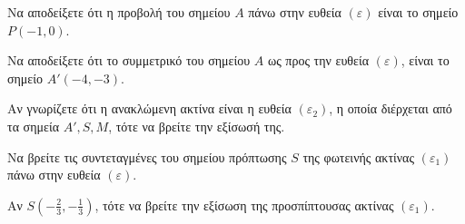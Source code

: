 \begin{alist}
    \item[$\alpha)$]
    \begin{rlist}
        \item Να αποδείξετε ότι η προβολή του σημείου $A$ πάνω στην ευθεία $(\varepsilon)$ είναι το σημείο $P(-1,0)$. 
        \item Να αποδείξετε ότι το συμμετρικό του σημείου $A$ ως προς την ευθεία $(\varepsilon)$, είναι το σημείο $A'(-4,-3)$. 
    \end{rlist}
    \item[$\beta)$]
    \begin{rlist}
        \item Αν γνωρίζετε ότι η ανακλώμενη ακτίνα είναι η ευθεία $(\varepsilon_2)$, η οποία διέρχεται από τα σημεία $A', S, M$, τότε να βρείτε την εξίσωσή της. 
        \item Να βρείτε τις συντεταγμένες του σημείου πρόπτωσης $S$ της φωτεινής ακτίνας $(\varepsilon_1)$ πάνω στην ευθεία $(\varepsilon)$. 
    \end{rlist}
    \item[$\gamma)$] Αν $S\left(-\frac{2}{3}, -\frac{1}{3}\right)$, τότε να βρείτε την εξίσωση της προσπίπτουσας ακτίνας $(\varepsilon_1)$. 
\end{alist}